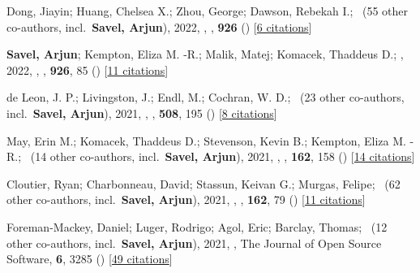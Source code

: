 \item[{\color{numcolor}\scriptsize9}] Dong, Jiayin; Huang, Chelsea X.; Zhou, George; Dawson, Rebekah I.; \etal\ ({55} other co-authors, incl.\ \textbf{Savel, Arjun}), 2022, , \apj, \textbf{926} () [\href{https://ui.adsabs.harvard.edu/abs/2022ApJ...926L...7D}{6 citations}]

\item[{\color{numcolor}\scriptsize8}] \textbf{Savel, Arjun}; Kempton, Eliza M. -R.; Malik, Matej; Komacek, Thaddeus D.; \etal, 2022, , \apj, \textbf{926}, 85 () [\href{https://ui.adsabs.harvard.edu/abs/2022ApJ...926...85S}{11 citations}]

\item[{\color{numcolor}\scriptsize7}] de Leon, J. P.; Livingston, J.; Endl, M.; Cochran, W. D.; \etal\ ({23} other co-authors, incl.\ \textbf{Savel, Arjun}), 2021, , \mnras, \textbf{508}, 195 () [\href{https://ui.adsabs.harvard.edu/abs/2021MNRAS.508..195D}{8 citations}]

\item[{\color{numcolor}\scriptsize6}] May, Erin M.; Komacek, Thaddeus D.; Stevenson, Kevin B.; Kempton, Eliza M. -R.; \etal\ ({14} other co-authors, incl.\ \textbf{Savel, Arjun}), 2021, , \aj, \textbf{162}, 158 () [\href{https://ui.adsabs.harvard.edu/abs/2021AJ....162..158M}{14 citations}]

\item[{\color{numcolor}\scriptsize5}] Cloutier, Ryan; Charbonneau, David; Stassun, Keivan G.; Murgas, Felipe; \etal\ ({62} other co-authors, incl.\ \textbf{Savel, Arjun}), 2021, , \aj, \textbf{162}, 79 () [\href{https://ui.adsabs.harvard.edu/abs/2021AJ....162...79C}{11 citations}]

\item[{\color{numcolor}\scriptsize4}] Foreman-Mackey, Daniel; Luger, Rodrigo; Agol, Eric; Barclay, Thomas; \etal\ ({12} other co-authors, incl.\ \textbf{Savel, Arjun}), 2021, , The Journal of Open Source Software, \textbf{6}, 3285 () [\href{https://ui.adsabs.harvard.edu/abs/2021JOSS....6.3285F}{49 citations}]

